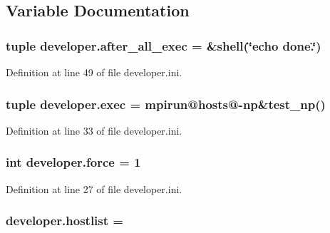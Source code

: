 \subsection{Variable Documentation}
\hypertarget{namespacedeveloper_a458db43e4dbfd00d4faf1c4190b5e108}{
\subsubsection[{after\-\_\-all\-\_\-exec}]{\setlength{\rightskip}{0pt plus 5cm}tuple developer.\-after\-\_\-all\-\_\-exec = \&shell(\char`\"{}echo done.\char`\"{})}}\label{namespacedeveloper_a458db43e4dbfd00d4faf1c4190b5e108}


Definition at line 49 of file developer.\-ini.

\hypertarget{namespacedeveloper_a350aecc0787354537b0c7f0c30b6ea96}{
\subsubsection[{exec}]{\setlength{\rightskip}{0pt plus 5cm}tuple developer.\-exec = mpirun@{\bf hosts}@-\/np\&test\-\_\-np()}}\label{namespacedeveloper_a350aecc0787354537b0c7f0c30b6ea96}


Definition at line 33 of file developer.\-ini.

\hypertarget{namespacedeveloper_a80fe514b51ced8931e7aee0e115c57fe}{
\subsubsection[{force}]{\setlength{\rightskip}{0pt plus 5cm}int developer.\-force = 1}}\label{namespacedeveloper_a80fe514b51ced8931e7aee0e115c57fe}


Definition at line 27 of file developer.\-ini.

\hypertarget{namespacedeveloper_a4ae5cd1ac5f1f3c712a1356615cc4883}{
\subsubsection[{hostlist}]{\setlength{\rightskip}{0pt plus 5cm}developer.\-hostlist =}}\label{namespacedeveloper_a4ae5cd1ac5f1f3c712a1356615cc4883}


